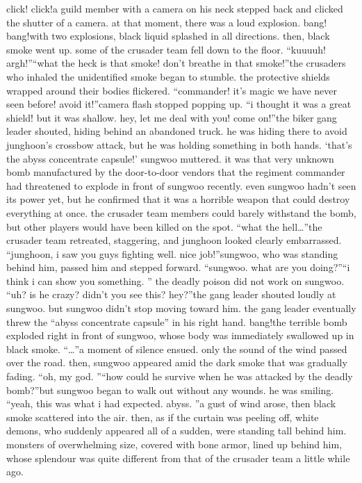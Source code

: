 click! click!a guild member with a camera on his neck stepped back and clicked the shutter of a camera.
at that moment, there was a loud explosion.
bang! bang!with two explosions, black liquid splashed in all directions.
 then, black smoke went up.
 some of the crusader team fell down to the floor.
“kuuuuh! argh!”“what the heck is that smoke! don’t breathe in that smoke!”the crusaders who inhaled the unidentified smoke began to stumble.
 the protective shields wrapped around their bodies flickered.
“commander! it’s magic we have never seen before! avoid it!”camera flash stopped popping up.
“i thought it was a great shield! but it was shallow.
 hey, let me deal with you! come on!”the biker gang leader shouted, hiding behind an abandoned truck.
he was hiding there to avoid junghoon’s crossbow attack, but he was holding something in both hands.
‘that’s the abyss concentrate capsule!’ sungwoo muttered.
it was that very unknown bomb manufactured by the door-to-door vendors that the regiment commander had threatened to explode in front of sungwoo recently.
even sungwoo hadn’t seen its power yet, but he confirmed that it was a horrible weapon that could destroy everything at once.
 the crusader team members could barely withstand the bomb, but other players would have been killed on the spot.
“what the hell…”the crusader team retreated, staggering, and junghoon looked clearly embarrassed.
“junghoon, i saw you guys fighting well.
 nice job!”sungwoo, who was standing behind him, passed him and stepped forward.
“sungwoo.
 what are you doing?”“i think i can show you something.
”
the deadly poison did not work on sungwoo.
“uh? is he crazy? didn’t you see this? hey?”the gang leader shouted loudly at sungwoo.
 but sungwoo didn’t stop moving toward him.
the gang leader eventually threw the “abyss concentrate capsule” in his right hand.
bang!the terrible bomb exploded right in front of sungwoo, whose body was immediately swallowed up in black smoke.
“…”a moment of silence ensued.
 only the sound of the wind passed over the road.
then, sungwoo appeared amid the dark smoke that was gradually fading.
“oh, my god.
”“how could he survive when he was attacked by the deadly bomb?”but sungwoo began to walk out without any wounds.
 he was smiling.
“yeah, this was what i had expected.
 abyss.
”a gust of wind arose, then black smoke scattered into the air.
 then, as if the curtain was peeling off, white demons, who suddenly appeared all of a sudden, were standing tall behind him.
monsters of overwhelming size, covered with bone armor, lined up behind him, whose splendour was quite different from that of the crusader team a little while ago.
